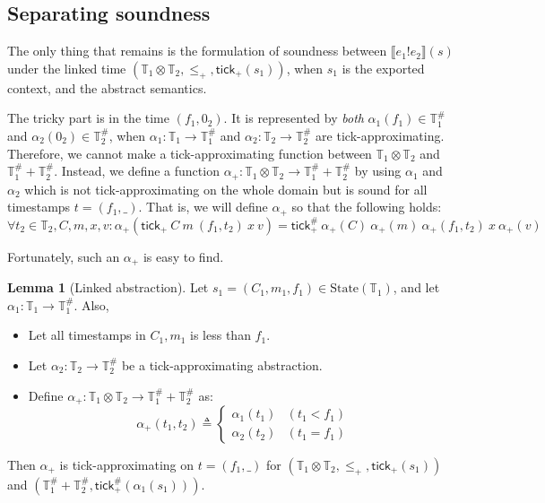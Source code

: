 \documentclass[acmsmall,review]{acmart}\settopmatter{printfolios=true,printccs=false,printacmref=false}
\theoremstyle{definition}
\newtheorem{lem}{Lemma}[section]
\newcommand*{\A}[1]{{#1}^{\#}}
\newcommand*{\Time}{\mathbb{T}}
\newcommand*{\ATime}{\A{\Time}}
\newcommand*{\mem}{m}
\newcommand*{\State}[1]{\text{State}({#1})}
\newcommand*{\link}[2]{{#1}\mathtt{!}{#2}}
\newcommand*{\sembracket}[1]{\lBrack{#1}\rBrack}
\newcommand*{\tick}{\mathsf{tick}}
\begin{document}
\subsection{Separating soundness}
The only thing that remains is the formulation of soundness between $\sembracket{\link{e_1}{e_2}}(s)$ under the linked time $(\Time_1\otimes\Time_2,\le_+,\tick_{+}(s_1))$, when $s_1$ is the exported context, and the abstract semantics.

The tricky part is in the time $(f_1,0_2)$.
It is represented by \emph{both} $\alpha_1(f_1)\in\ATime_1$ and $\alpha_2(0_2)\in\ATime_2$, when $\alpha_1:\Time_1\rightarrow\ATime_1$ and $\alpha_2:\Time_2\rightarrow\ATime_2$ are tick-approximating.
Therefore, we cannot make a tick-approximating function between $\Time_1\otimes\Time_2$ and $\ATime_1+\ATime_2$.
Instead, we define a function $\alpha_+:\Time_1\otimes\Time_2\rightarrow\ATime_1+\ATime_2$ by using $\alpha_1$ and $\alpha_2$ which is not tick-approximating on the whole domain but is sound for all timestamps $t=(f_1,\_)$.
That is, we will define $\alpha_+$ so that the following holds:
\[
  \forall t_2\in\Time_2,C,\mem,x,v:\alpha_+(\tick_+\:C\:\mem\:(f_1,t_2)\:x\:v)=\A\tick_+\:\alpha_+(C)\:\alpha_+(\mem)\:\alpha_+(f_1,t_2)\:x\:\alpha_+(v)
\]

Fortunately, such an $\alpha_+$ is easy to find.
\begin{lem}[Linked abstraction]
  Let $s_1=(C_1,\mem_1,f_1)\in\State{\Time_1}$, and let $\alpha_1:\Time_1\rightarrow\ATime_1$. Also,

  \begin{itemize}
    \item Let all timestamps in $C_1,\mem_1$ is less than $f_1$.
    \item Let $\alpha_2:\Time_2\rightarrow\ATime_2$ be a tick-approximating abstraction.
    \item Define $\alpha_+:\Time_1\otimes\Time_2\rightarrow\ATime_1+\ATime_2$ as:
          \[
            \alpha_+(t_1,t_2)\triangleq
            \begin{cases}
              \alpha_1(t_1) & (t_1<f_1) \\
              \alpha_2(t_2) & (t_1=f_1)
            \end{cases}
          \]
  \end{itemize}
  Then $\alpha_+$ is tick-approximating on $t=(f_1,\_)$ for $(\Time_1\otimes\Time_2,\le_+,\tick_+(s_1))$ and $(\ATime_1+\ATime_2,\A\tick_+(\alpha_1(s_1)))$.
\end{lem}
\end{document}

